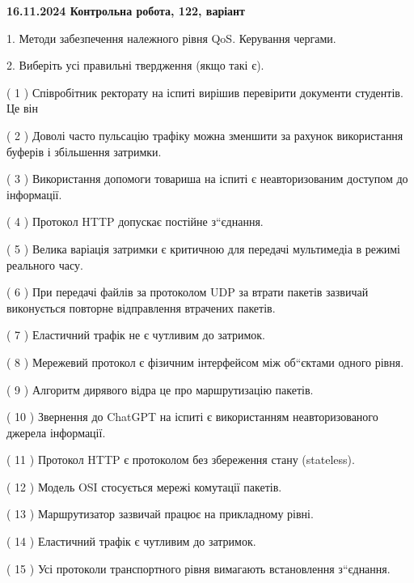 \documentclass[12pt, ukrainian]{article}
\begin{document}
\vspace{4mm}
\newpage
\begin {large}

\textbf{16.11.2024 Контрольна робота, 122, варіант  }\par


{
1. Методи забезпечення належного рівня QoS. Керування чергами.



\vspace{5mm}
2. Виберіть усі правильні твердження (якщо такі є).\par
\vspace{2mm}

( 1 ) Співробітник ректорату на іспиті вирішив перевірити документи студентів. Це він

( 2 ) Доволі часто пульсацію трафіку можна зменшити за рахунок використання буферів і збільшення затримки.

( 3 ) Використання допомоги товариша на іспиті є неавторизованим доступом до інформації.

( 4 ) Протокол  HTTP допускає постійне з“єднання.

( 5 ) Велика варіація затримки є критичною для передачі мультимедіа в режимі реального часу.

( 6 ) При передачі файлів за протоколом UDP за втрати пакетів зазвичай виконується повторне відправлення втрачених пакетів.

( 7 ) Еластичний трафік не є чутливим до затримок.

( 8 ) Мережевий протокол є фізичним інтерфейсом між об“єктами одного рівня.

( 9 ) Алгоритм дирявого відра це про маршрутизацію пакетів.

( 10 ) Звернення до ChatGPT на іспиті є використанням неавторизованого джерела інформації.

( 11 ) Протокол  HTTP є протоколом без збереження стану (stateless).

( 12 ) Модель OSI стосується мережі комутації пакетів.

( 13 ) Маршрутизатор зазвичай працює на прикладному рівні.

( 14 ) Еластичний трафік є чутливим до затримок.

( 15 ) Усі протоколи транспортного рівня вимагають встановлення з“єднання.
}
\end {large}
\end{document}
